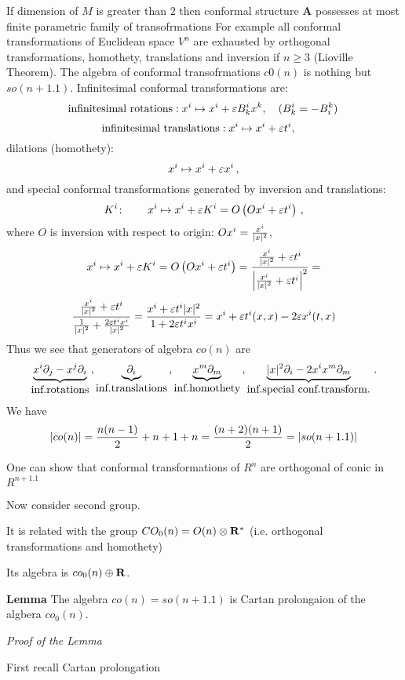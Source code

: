 If dimension of $M$ is greater than $2$ then conformal structure {\bf A}
possesses at most finite parametric family of transofrmations 
  For example all conformal transformations of Euclidean space $V^n$
are exhausted by orthogonal transformations, homothety,
translations and inversion
if $n\geq 3$ (Lioville Theorem). 
The algebra of conformal transofrmations
$c0(n)$ is nothing but $so(n+1.1)$. 
Infinitesimal conformal transformations are: 
        $$
\hbox {infinitesimal rotations}:  x^i\mapsto x^i+{\varepsilon} B^i_kx^k, \quad
     (B^i_k=-B^k_i)\,
        $$ 
        $$
\hbox {infinitesimal translations}:  x^i\mapsto x^i+{\varepsilon} t^i, \quad
        $$
dilations (homothety):
             $$
          x^i\mapsto x^i+{\varepsilon} x^i\,,
             $$ 
and special conformal transformations generated by 
inversion and translations:
             $$
  K^i\colon\qquad x^i\mapsto x^i+{\varepsilon} K^i=
       O\left(Ox^i+{\varepsilon} t^i\right)\,,
             $$
where $O$ is inversion with respect to origin: $Ox^i={x^i\over |x|^2}$,
             $$
x^i\mapsto x^i+{\varepsilon} K^i=
       O\left(Ox^i+{\varepsilon} t^i\right)=
      {{x^i\over |x|^2}+{\varepsilon} t^i
          \over
       \left|{x^i\over |x|^2}+{\varepsilon} t^i
\right|^2  }=
             $$
            $$
      {{x^i\over |x|^2}+{\varepsilon} t^i
          \over
       {1\over |x|^2}+{2{\varepsilon} t^ix^i\over |x|^2}
 }={x^i+{\varepsilon} t^i|x|^2
          \over
       1+2{\varepsilon} t^ix^i
 }=x^i+{\varepsilon} t^i(x,x)-2{\varepsilon} x^i(t,x)
          $$
Thus we see that generators of algebra $co(n)$ are
               $$
\underbrace
 {x^i\partial_j-x^j\partial_i}_{\hbox {inf.rotations}}
      \,,
\underbrace
 {\partial_i}_{\hbox {inf.translations}}
      \,,
\underbrace
 {x^m\partial_m}_{\hbox {inf.homothety}}
      \,,
\underbrace
 {|x|^2\partial_i-2x^ix^m\partial_m}_{\hbox {inf.special conf.transform.}}
      \,.
               $$
We have
                   $$
|co(n)|={n(n-1)\over 2}+n+1+n={(n+2)(n+1)\over 2}=|so(n+1.1)|
                   $$

One can show that conformal transformations of $R^n$ are orthogonal
of conic in $R^{n+1.1}$


Now consider second group.

It is related with the group $CO_0(n)=O(n)\otimes {\bf R}^*$
(i.e. orthogonal transformations and homothety)

Its algebra is $co_0(n)\oplus {\bf R}$. 

{\bf Lemma} The algebra $co(n)=so(n+1.1)$
is Cartan prolongaion of the algbera $co_0(n)$.

 {\sl Proof of the Lemma}

First recall Cartan prolongation

